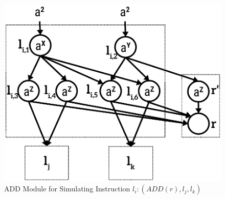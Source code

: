 \documentclass[runningheads,a4paper]{llncs}
\begin{document}
\begin{figure}
\begin{center}
\includegraphics[scale=0.50]{figures/add-module-2.pdf}
\caption{ADD Module for Simulating Instruction $l_i:(ADD(r), l_j, l_k)$}
\label{fig-add}
\end{center}
\end{figure}   
\end{document}
